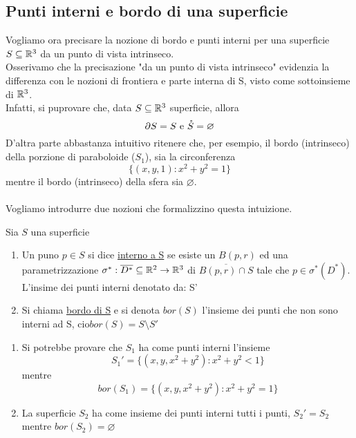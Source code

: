 \subsection{Punti interni e bordo di una superficie}
Vogliamo ora precisare la nozione di bordo e punti interni per una superficie 
$S\subseteq\mathbb{R}^3$ da un punto di vista intrinseco. \\
Osserivamo che la precisazione "da un punto di vista intrinseco" evidenzia la differenza
con le nozioni di frontiera e parte interna di S, visto come sottoinsieme di $\mathbb{R}^3$. \\
Infatti, si pu\aco provare che, data $S\subseteq\mathbb{R}^3$ superficie, allora 
$$\partial S = S \text{ e } \mathring{S} = \varnothing$$
D'altra parte \ace abbastanza intuitivo ritenere che, per esempio, il bordo (intrinseco) della 
porzione di paraboloide ($S_1$), sia la circonferenza 
$$\{(x,y,1):x^2+y^2=1\}$$
mentre il bordo (intrinseco) della sfera sia $\varnothing$. \\\\
Vogliamo introdurre due nozioni che formalizzino questa intuizione.
\begin{definition}
  Sia $S$ una superficie
  \begin{enumerate}
    \item Un puno $p\in S$ si dice \underline{interno a S} se esiste un 
          $B(p,r)$ ed una parametrizzazione $\sigma^* : \overline{D^*}\subseteq\mathbb{R}^2\to\mathbb{R}^3$
          di $\overline{B(p,r)\cap S}$ tale che $p\in \sigma^*(D^*)$. \\
          L'insime dei punti interni \ace denotato da: S'
    \item Si chiama \underline{bordo di S} e si denota $bor(S)$ l'insieme dei punti 
          che non sono interni ad S, cio\ace $bor(S) = S \setminus S'$
  \end{enumerate}
\end{definition}
\begin{example}
  \begin{enumerate}
    \item Si potrebbe provare che $S_1$ ha come punti interni l'insieme
          $$S_1' = \{(x,y,x^2+y^2):x^2+y^2<1\}$$
          mentre 
          $$bor(S_1) = \{(x,y,x^2+y^2):x^2+y^2=1\}$$
    \item La superficie $S_2$ ha come insieme dei punti interni tutti i punti, $S_2' = S_2$ 
          mentre $bor(S_2) = \varnothing$
  \end{enumerate}
\end{example}
